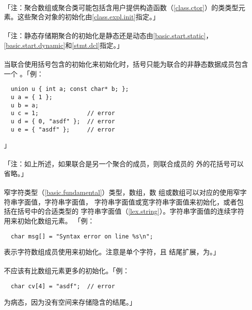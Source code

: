 \paragraph{}
「注：聚合数组或聚合类可能包括含用户提供构造函数（\ref{class.ctor}）的类类型元
素。这些聚合对象的初始化由\ref{class.expl.init}指定。」

\paragraph{}
「注：静态存储期聚合的初始化是静态还是动态由\ref{basic.start.static}，
\ref{basic.start.dynamic}和\ref{stmt.dcl}指定。」

\paragraph{}
当联合使用括号包含的初始化来初始化时，括号只能为联合的非静态数据成员包含一个
。「例：
\begin{lstlisting}
  union u { int a; const char* b; };
  u a = { 1 };
  u b = a;
  u c = 1;              // error
  u d = { 0, "asdf" };  // error
  u e = { "asdf" };     // error
\end{lstlisting}」

\paragraph{}
「注：如上所述，如果联合是另一个聚合的成员，则联合成员的
外的花括号可以省略。」

\paragraph{}
窄字符类型（\ref{basic.fundamental}）类型，数组，数
组或数组可以对应的使用窄字符串字面值，字符串字面值，
字符串字面值或宽字符串字面值来初始化，或者包括在括号中的合适类型的
字符串字面值（\ref{lex.string}）。字符串字面值的连续字符用来初始化数组元素。
「例：
\begin{lstlisting}
  char msg[] = "Syntax error on line %s\n";
\end{lstlisting}
表示字符数组成员使用来初始化。注意是单个字符，且
结尾扩展，为。」

\paragraph{}
不应该有比数组元素更多的初始化。「例：
\begin{lstlisting}
  char cv[4] = "asdf";  // error
\end{lstlisting}
为病态，因为没有空间来存储隐含的结尾。」

